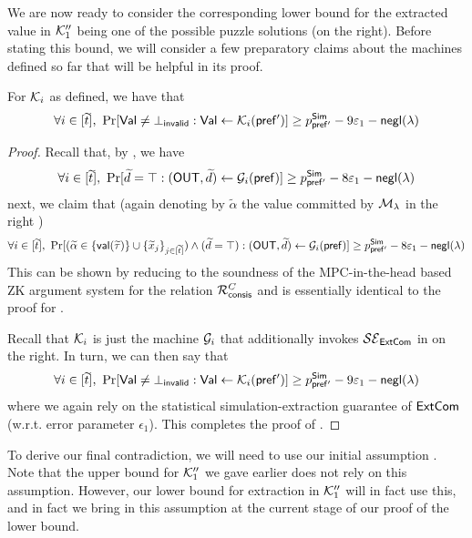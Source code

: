 \iffalse

We are now ready to consider the corresponding lower bound for the extracted value in $\mathcal{K}_1''$ being one of the possible puzzle solutions (on the right). Before stating this bound, we will consider a few preparatory claims about the machines defined so far that will be helpful in its proof. 

\begin{MyClaim}\label{pq:claim:Ki:validity}
 For $\mathcal{K}_i$ as defined, we have that $$\forall i \in [\tilde{t}],\ \Pr[\msf{Val} \neq \bot_\msf{invalid}: \msf{Val} \gets \mcal{K}_i(\msf{pref'})] \geq p^{\msf{Sim}}_{\msf{pref'}} - 9\epsilon_1 - \negl(\secpar)$$
\end{MyClaim}

\begin{proof}
Recall that, by , we have
$$\forall i \in [\widetilde{t}], ~\Pr[\widetilde{d} = \top : (\mathsf{OUT}, \widetilde{d}) \gets \mathcal{G}_i(\mathsf{pref})] \ge p^{\mathsf{Sim}}_{\mathsf{pref'}} - 8\varepsilon_1 -\mathsf{negl}(\lambda)$$ 
next, we claim that (again denoting by $\tilde{\alpha}$ the value committed by $\mathcal{M}_\lambda$ in the right )
$$\forall i \in [\widetilde{t}], ~\Pr[(\widetilde{\alpha} \in \{\mathsf{val}(\widetilde{\tau})\} \cup \{\widetilde{x}_j\}_{j \in [\widetilde{t}]}) \wedge (\widetilde{d} = \top): (\mathsf{OUT},\widetilde{d}) \gets \mathcal{G}_i(\mathsf{pref})] \geq p^{\mathsf{Sim}}_{\mathsf{pref'}} - 8\varepsilon_1 - \mathsf{negl}(\lambda)$$ 
This can be shown by reducing to the soundness of the MPC-in-the-head based ZK argument system for the relation $\mathcal{R}^C_\mathsf{consis}$ and is essentially identical to the proof for . 

Recall that $\mathcal{K}_i$ is just the machine $\mathcal{G}_i$ that additionally invokes $\mathcal{SE}_\mathsf{ExtCom}$ in  on the right. In turn, we can then say that $$\forall i \in [\tilde{t}],\ \Pr[\msf{Val} \neq \bot_\msf{invalid}: \msf{Val} \gets \mcal{K}_i(\msf{pref'})] \geq p^{\msf{Sim}}_{\msf{pref'}} - 9\epsilon_1 - \negl(\secpar)$$ where we again rely on the statistical simulation-extraction guarantee of $\mathsf{ExtCom}$ (w.r.t. error parameter $\epsilon_1$). This completes the proof of .
\end{proof}

To derive our final contradiction, we will need to use our initial assumption . Note that the upper bound for $\mathcal{K}_1''$ we gave earlier does not rely on this assumption. However, our lower bound for extraction in $\mathcal{K}_1''$ will in fact use this, and in fact we bring in this assumption at the current stage of our proof of the lower bound.  

